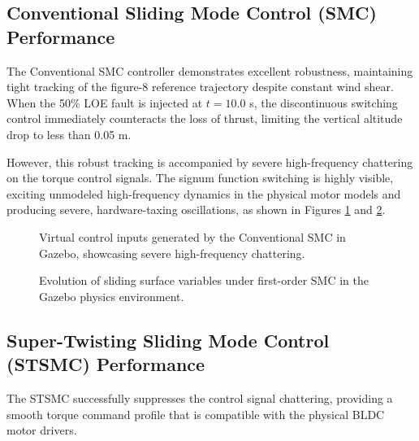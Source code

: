 \subsection{Conventional Sliding Mode Control (SMC) Performance}
The Conventional SMC controller demonstrates excellent robustness, maintaining tight tracking of the figure-8 reference trajectory despite constant wind shear. When the 50\% LOE fault is injected at $t = 10.0$ s, the discontinuous switching control immediately counteracts the loss of thrust, limiting the vertical altitude drop to less than 0.05 m. 

However, this robust tracking is accompanied by severe high-frequency chattering on the torque control signals. The signum function switching is highly visible, exciting unmodeled high-frequency dynamics in the physical motor models and producing severe, hardware-taxing oscillations, as shown in Figures \ref{fig:gazebo_smc_inputs} and \ref{fig:gazebo_smc_surfaces}.

\begin{figure}[htbp]
\centering
{}
\caption{Virtual control inputs generated by the Conventional SMC in Gazebo, showcasing severe high-frequency chattering.}
\label{fig:gazebo_smc_inputs}
\end{figure}

\begin{figure}[htbp]
\centering
{}
\caption{Evolution of sliding surface variables under first-order SMC in the Gazebo physics environment.}
\label{fig:gazebo_smc_surfaces}
\end{figure}

\subsection{Super-Twisting Sliding Mode Control (STSMC) Performance}
The STSMC successfully suppresses the control signal chattering, providing a smooth torque command profile that is compatible with the physical BLDC motor drivers. 

